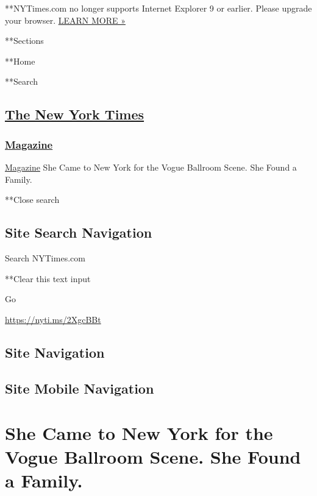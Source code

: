  **NYTimes.com no longer supports Internet Explorer 9 or earlier. Please
upgrade your browser.
\href{http://www.nytimes3xbfgragh.onion/content/help/site/ie9-support.html}{LEARN
MORE »}

**Sections

**Home

**Search

\hypertarget{the-new-york-times}{%
\subsection{\texorpdfstring{\href{http://www.nytimes3xbfgragh.onion/}{The
New York Times}}{The New York Times}}\label{the-new-york-times}}

\hypertarget{-magazine-}{%
\subsubsection{\texorpdfstring{
\href{https://www.nytimes3xbfgragh.onion/section/magazine}{Magazine}
}{ Magazine }}\label{-magazine-}}

 \href{https://www.nytimes3xbfgragh.onion/section/magazine}{Magazine}
\textbar{}She Came to New York for the Vogue Ballroom Scene. She Found a
Family.

**Close search

\hypertarget{site-search-navigation}{%
\subsection{Site Search Navigation}\label{site-search-navigation}}

Search NYTimes.com

**Clear this text input

Go

\url{https://nyti.ms/2XgcBBt}

\hypertarget{site-navigation}{%
\subsection{Site Navigation}\label{site-navigation}}

\hypertarget{site-mobile-navigation}{%
\subsection{Site Mobile Navigation}\label{site-mobile-navigation}}

\hypertarget{she-came-to-new-york-for-the-vogue-ballroom-scene-she-found-a-family}{%
\section{She Came to New York for the Vogue Ballroom Scene. She Found a
Family.}\label{she-came-to-new-york-for-the-vogue-ballroom-scene-she-found-a-family}}

